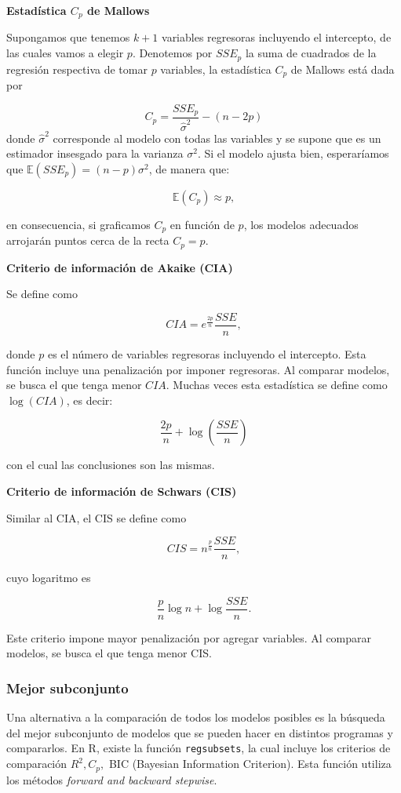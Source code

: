 \documentclass[
]{book}
\begin{document}
\textbf{Estadística \(C_p\) de Mallows}

Supongamos que tenemos \(k+1\) variables regresoras incluyendo el intercepto, de las cuales vamos a elegir \(p\). Denotemos por \(SSE_p\) la suma de cuadrados de la regresión respectiva de tomar \(p\) variables, la estadística \(C_p\) de Mallows está dada por

\[C_p = \frac{SSE_p}{\hat{\sigma}^2} - (n-2p)  \]
donde \(\hat{\sigma}^2\) corresponde al modelo con todas las variables y se supone que es un estimador insesgado para la varianza \(\sigma^2\). Si el modelo ajusta bien, esperaríamos que \(\mathbb{E}(SSE_p)=(n-p)\sigma^2\), de manera que:

\[\mathbb{E}(C_p)\approx p,\]

en consecuencia, si graficamos \(C_p\) en función de \(p\), los modelos adecuados arrojarán puntos cerca de la recta \(C_p=p\).

\textbf{Criterio de información de Akaike (CIA)}

Se define como

\[CIA = e^{\frac{2p}{n}}\frac{SSE}{n},\]

donde \(p\) es el número de variables regresoras incluyendo el intercepto. Esta función incluye una penalización por imponer regresoras. Al comparar modelos, se busca el que tenga menor \(CIA\). Muchas veces esta estadística se define como \(\log(CIA)\), es decir:

\[\frac{2p}{n}+\log(\frac{SSE}{n})\]

con el cual las conclusiones son las mismas.

\textbf{Criterio de información de Schwars (CIS)}

Similar al CIA, el CIS se define como

\[CIS = n^{\frac{p}{n}}\frac{SSE}{n},\]

cuyo logaritmo es

\[\frac{p}{n}\log{n} + \log{\frac{SSE}{n}}.\]

Este criterio impone mayor penalización por agregar variables. Al comparar modelos, se busca el que tenga menor CIS.

\subsubsection{Mejor subconjunto}\label{mejor-subconjunto}

Una alternativa a la comparación de todos los modelos posibles es la búsqueda del mejor subconjunto de modelos que se pueden hacer en distintos programas y compararlos. En R, existe la función \texttt{regsubsets}, la cual incluye los criterios de comparación \(R^2, C_p,\) BIC (Bayesian Information Criterion). Esta función utiliza los métodos \emph{forward and backward stepwise}.
\end{document}
